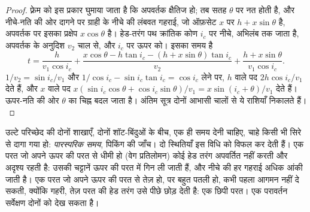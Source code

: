 \begin{proof}
फ़्रेम को इस प्रकार घुमाया जाता है कि अपवर्तक क्षैतिज हो; तब सतह
$\theta$ पर नत होती है, और नीचे-नति की ओर दागने पर ग्राही के नीचे की लंबवत गहराई, जो
ऑफ़सेट $x$ पर $h + x\sin\theta$ है, अपवर्तक पर इसका प्रक्षेप
$x\cos\theta$ है। हेड-तरंग पथ क्रांतिक कोण $i_c$ पर नीचे, अभिलंब तक जाता है,
अपवर्तक के अनुदिश $v_2$ चाल से, और $i_c$ पर ऊपर को। इसका समय है
\[
  t = \frac{h}{v_1\cos i_c} + \frac{x\cos\theta - h\tan i_c - (h + x\sin\theta)\tan i_c}{v_2}
  + \frac{h + x\sin\theta}{v_1\cos i_c}.
\]
$1/v_2 = \sin i_c/v_1$ और $1/\cos i_c - \sin i_c\tan i_c = \cos i_c$ लेने पर,
$h$ वाले पद $2h\cos i_c/v_1$ देते हैं, और $x$ वाले पद
$x(\sin i_c\cos\theta + \cos i_c\sin\theta)/v_1 = x\sin(i_c + \theta)/v_1$ देते हैं।
ऊपर-नति की ओर $\theta$ का चिह्न बदल जाता है। अंतिम सूत्र दोनों
आभासी चालों से ये राशियाँ निकालते हैं।
\end{proof}

उल्टे परिच्छेद की दोनों शाखाएँ, दोनों शॉट-बिंदुओं के बीच, एक ही समय देनी चाहिए,
चाहे किसी भी सिरे से दागा गया हो: \emph{पारस्परिक समय}, पिकिंग की
जाँच। दो स्थितियाँ इस विधि को विफल कर देती हैं। एक परत जो अपने ऊपर की परत से धीमी हो
(वेग प्रतिलोमन) कोई हेड तरंग अपवर्तित नहीं करती और अदृश्य रहती है: उसकी चट्टानें
ऊपर की परत में गिन ली जाती हैं, और नीचे की हर गहराई अधिक आंकी जाती है। एक परत
जो अपने ऊपर की परत से तेज़ हो, पर बहुत पतली हो, कभी पहला आगमन नहीं दे सकती, क्योंकि
गहरी, तेज़ परत की हेड तरंग उसे पीछे छोड़ देती है: एक छिपी परत। एक
परावर्तन सर्वेक्षण दोनों को देख सकता है।

